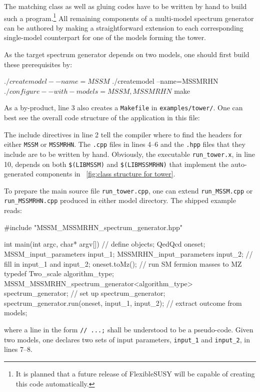 \documentclass[final,3p,11pt,pdflatex]{elsarticle}
\makeatletter
\newcommand{\fs}{FlexibleSUSY\@\xspace}
\newcommand{\code}[1]{\lstinline|#1|}  %
\newcommand{\figref}[1]{\figurename~\ref{#1}}
\makeatother
\begin{document}
The matching class as well as gluing codes have to be written by hand
to build such a program.\footnote{It is planned that a future release
  of \fs will be capable of creating this code automatically.}  All
remaining components of a multi-model spectrum generator can be authored
by making a straightforward extension
to each corresponding single-model counterpart
for one of the models forming the tower.

As the target spectrum generator depends on two models,
one should first build these prerequisites by:
\begin{numlstlisting}
$ ./createmodel --name=MSSM
$ ./createmodel --name=MSSMRHN
$ ./configure --with-models=MSSM,MSSMRHN
$ make
\end{numlstlisting}
As a by-product, line 3
also creates a \code{Makefile} in \code{examples/tower/}.
One can best see the overall code structure of the application in this file:
The include directives in line 2 tell the compiler
where to find the headers for either \code{MSSM} or \code{MSSMRHN}.
The \code{.cpp} files in lines 4--6 and the \code{.hpp} files
that they include are to be written by hand.
Obviously, the executable \code{run_tower.x}, in line 10, depends on both
\code{$(LIBMSSM)} and \code{$(LIBMSSMRHN)}
that implement the auto-generated
components in \figref{fig:class structure for tower}.

To prepare the main source file \code{run_tower.cpp},
one can extend %
\code{run_MSSM.cpp} or \code{run_MSSMRHN.cpp}
produced in either model directory.
The shipped example reads:
\begin{numlstlisting}
#include "MSSM_MSSMRHN_spectrum_generator.hpp"

int main(int argc, char* argv[])
{
  // define objects;
  QedQcd oneset;
  MSSM_input_parameters    input_1;
  MSSMRHN_input_parameters input_2;
  // fill in input_1 and input_2;
  oneset.toMz(); // run SM fermion masses to MZ
  typedef Two_scale algorithm_type;
  MSSM_MSSMRHN_spectrum_generator<algorithm_type> spectrum_generator;
  // set up spectrum_generator;
  spectrum_generator.run(oneset, input_1, input_2);
  // extract outcome from models;
}
\end{numlstlisting}
where a line in the form \code{// ...;} shall be understood
to be a pseudo-code.
Given two models,
one declares two sets of input parameters,
\code{input_1} and \code{input_2}, in lines 7--8.
\end{document}
